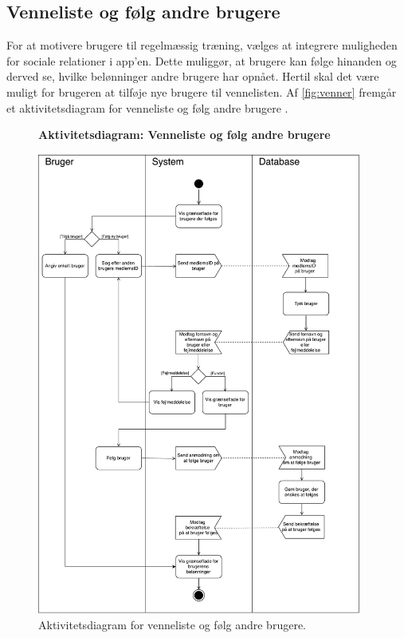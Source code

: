 \subsection*{Venneliste og følg andre brugere} 
For at motivere brugere til regelmæssig træning, vælges at integrere muligheden for sociale relationer i app'en. Dette muliggør, at brugere kan følge hinanden og derved se, hvilke belønninger andre brugere har opnået. Hertil skal det være muligt for brugeren at tilføje nye brugere til vennelisten. 
Af \autoref{fig:venner} fremgår et aktivitetsdiagram for venneliste og følg andre brugere . 

\begin{figure} [H]
\centering
\textbf{Aktivitetsdiagram: Venneliste og følg andre brugere}\par\medskip
\includegraphics[width=0.95\textwidth]{figures/aktivitetsdiagram/venner}
\caption{Aktivitetsdiagram for venneliste og følg andre brugere.}
\label{fig:venner}
\end{figure}

